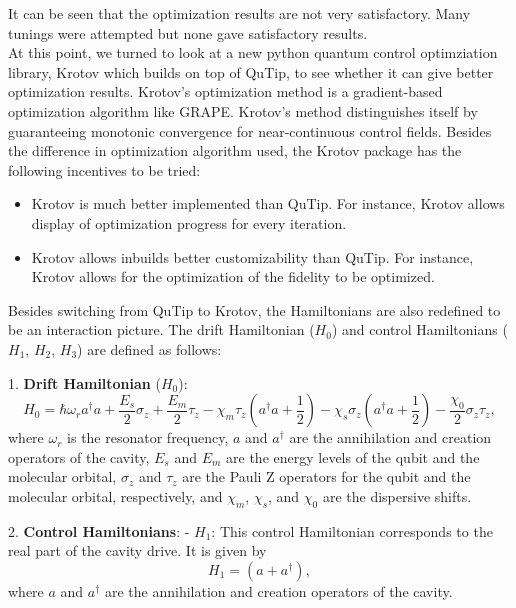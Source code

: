 \documentclass[12pt]{article}
\begin{document}
It can be seen that the optimization results are not very satisfactory. 
Many tunings were attempted but none gave satisfactory results.
\\
At this point, we turned to look at a new python quantum control optimziation library, Krotov which builds on top of QuTip,
to see whether it can give better optimization results. Krotov’s optimization method is a gradient-based optimization algorithm like GRAPE. 
Krotov’s method distinguishes itself by guaranteeing monotonic convergence for near-continuous control fields. 
Besides the difference in optimization algorithm used, the Krotov package has the following incentives to be tried: 
\begin{itemize}
    \item Krotov is much better implemented than QuTip. For instance, Krotov allows display of optimization progress for every iteration. 
    \item Krotov allows inbuilds better customizability than QuTip. 
            For instance, Krotov allows for the optimization of the fidelity to be optimized.
\end{itemize}

Besides switching from QuTip to Krotov, the Hamiltonians are also redefined to be an interaction picture. 
The drift Hamiltonian ($H_0$) and control Hamiltonians ($H_1$, $H_2$, $H_3$) are defined as follows:

1. \textbf{Drift Hamiltonian} ($H_0$):
\begin{equation}
H_0 = \hbar \omega_r a^\dagger a + \frac{E_s}{2} \sigma_z + \frac{E_m}{2} \tau_z - \chi_m \tau_z \left(a^\dagger a + \frac{1}{2}\right) - \chi_s \sigma_z \left(a^\dagger a + \frac{1}{2}\right) - \frac{\chi_0}{2} \sigma_z \tau_z,
\end{equation}
where $\omega_r$ is the resonator frequency, $a$ and $a^\dagger$ are the annihilation and creation operators of the cavity, $E_s$ and $E_m$ are the energy levels of the qubit and the molecular orbital, $\sigma_z$ and $\tau_z$ are the Pauli Z operators for the qubit and the molecular orbital, respectively, and $\chi_m$, $\chi_s$, and $\chi_0$ are the dispersive shifts.

2. \textbf{Control Hamiltonians}:
   - $H_1$: This control Hamiltonian corresponds to the real part of the cavity drive. It is given by
     \begin{equation}
     H_1 = \left(a + a^\dagger\right),
     \end{equation}
     where $a$ and $a^\dagger$ are the annihilation and creation operators of the cavity.
\end{document}
